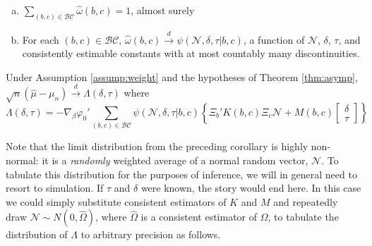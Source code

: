 \begin{assump}\mbox{}
	\begin{enumerate}[(a)] 
		\item $\sum_{(b,c) \in \mathcal{BC}} \widehat{\omega}(b,c) = 1$, almost surely
    \item For each $(b,c) \in \mathcal{BC}$, $\widehat{\omega}(b,c) \overset{d}{\rightarrow} \psi(\mathscr{N}, \delta, \tau|b,c)$,  a function of $\mathscr{N}$, $\delta$, $\tau$, and consistently estimable constants with at most countably many discontinuities.
	\end{enumerate}
\label{assump:weight}
\end{assump}

\begin{cor}
  Under Assumption \ref{assump:weight} and the hypotheses of Theorem \ref{thm:asymp},  
	$\sqrt{n}\left(\widehat{\mu} - \mu_n\right) \overset{d}{\rightarrow} \Lambda(\delta,\tau)$
where
	\begin{equation}
		\Lambda(\delta,\tau) = -\nabla_\beta\varphi_0' \sum_{(b,c) \in \mathcal{BC}} \psi(\mathscr{N},\delta, \tau|b,c) \left\{\Xi_b' K(b,c) \Xi_c \mathscr{N} + M(b,c)  \left[\begin{array}{c}\delta \\ \tau \end{array} \right]\right\}
	\end{equation}
  \label{cor:avg}
\end{cor}
Note that the limit distribution from the preceding corollary is highly non-normal: it is a \emph{randomly} weighted average of a normal random vector, $\mathscr{N}$.
To tabulate this distribution for the purposes of inference, we will in general need to resort to simulation.
If $\tau$ and $\delta$ were known, the story would end here.
In this case we could simply substitute consistent estimators of $K$ and $M$ and repeatedly draw $\mathscr{N} \sim N(0, \widehat{\Omega})$, where $\widehat{\Omega}$ is a consistent estimator of $\Omega$, to tabulate the distribution of $\Lambda$ to arbitrary precision as follows.

